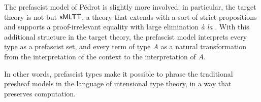 The prefascist model of Pédrot is slightly more involved: in particular, the target theory
is not \MLTT but \( \mathsf{sMLTT} \), a theory that extends \MLTT with a sort of 
strict propositions and supports a proof-irrelevant equality with large
elimination \emph{à la} \Lean.
% 
With this additional structure in the target theory, the prefascist model
interprets every type as a prefascist set, and every term of type \( A \) as a 
natural transformation from the interpretation of the context to the 
interpretation of \( A \).

In other words, prefascist types make it possible to phrase the traditional
presheaf models in the language of intensional type theory, in a way that 
preserves computation.

